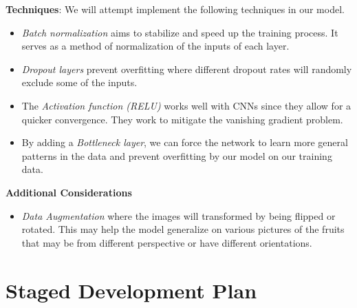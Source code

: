 \documentclass[11pt]{article}
\begin{document}
\textbf{Techniques}: 
We will attempt implement the following techniques in our model.
\begin{itemize}
    \item \emph{Batch normalization} aims to stabilize and speed up the training process. It serves as a method of normalization of the inputs of each layer. 
    \item \emph{Dropout layers} prevent overfitting where different dropout rates will randomly exclude some of the inputs. 
    \item The \emph{Activation function (RELU)} works well with CNNs since they allow for a quicker convergence. They work to mitigate the vanishing gradient problem. 
    \item By adding a \emph{Bottleneck layer}, we can force the network to learn more general patterns in the data and prevent overfitting by our model on our training data.
    
\end{itemize}

\textbf{Additional Considerations} 
\begin{itemize}
    \item \emph{Data Augmentation} where the images will transformed by being flipped or rotated. This may help the model generalize on various pictures of the fruits that may be from different perspective or have different orientations.
\end{itemize}

\section{Staged Development Plan}
\end{document}
